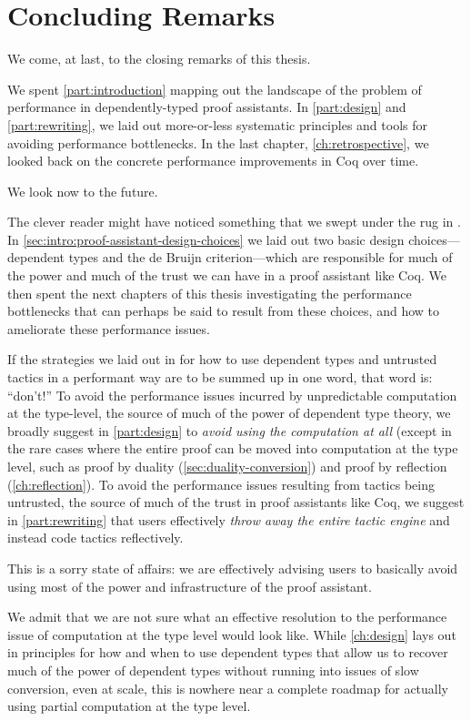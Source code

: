 \chapter{Concluding Remarks}\label{ch:conclusion}
We come, at last, to the closing remarks of this thesis.

We spent \autoref{part:introduction} mapping out the landscape of the problem of performance in dependently-typed proof assistants.
In \autoref{part:design} and \autoref{part:rewriting}, we laid out more-or-less systematic principles and tools for avoiding performance bottlenecks.
In the last chapter, \autoref{ch:retrospective}, we looked back on the concrete performance improvements in Coq over time.

We look now to the future.

The clever reader might have noticed something that we swept under the rug in .
In \autoref{sec:intro:proof-assistant-design-choices} we laid out two basic design choices---dependent types and the de Bruijn criterion---which are responsible for much of the power and much of the trust we can have in a proof assistant like Coq.
We then spent the next chapters of this thesis investigating the performance bottlenecks that can perhaps be said to result from these choices, and how to ameliorate these performance issues.

If the strategies we laid out in  for how to use dependent types and untrusted tactics in a performant way are to be summed up in one word, that word is: ``don't!''
To avoid the performance issues incurred by unpredictable computation at the type-level, the source of much of the power of dependent type theory, we broadly suggest in \autoref{part:design} to \emph{avoid using the computation at all} (except in the rare cases where the entire proof can be moved into computation at the type level, such as proof by duality (\autoref{sec:duality-conversion}) and proof by reflection (\autoref{ch:reflection}).
To avoid the performance issues resulting from tactics being untrusted, the source of much of the trust in proof assistants like Coq, we suggest in \autoref{part:rewriting} that users effectively \emph{throw away the entire tactic engine} and instead code tactics reflectively.

This is a sorry state of affairs:
we are effectively advising users to basically avoid using most of the power and infrastructure of the proof assistant.

We admit that we are not sure what an effective resolution to the performance issue of computation at the type level would look like.
While \autoref{ch:design} lays out in  principles for how and when to use dependent types that allow us to recover much of the power of dependent types without running into issues of slow conversion, even at scale, this is nowhere near a complete roadmap for actually using partial computation at the type level.

